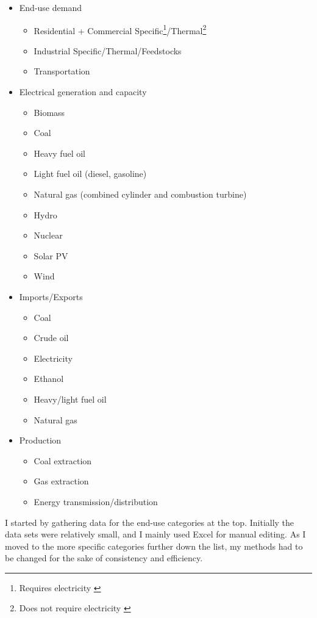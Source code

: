 \documentclass{article}
\begin{document}
\begin{itemize}
    \item End-use demand
    \begin{itemize}
        \item Residential + Commercial Specific\footnote{Requires electricity \citep{messageDocs}}/Thermal\footnote{Does not require electricity \citep{messageDocs}}
        \item Industrial Specific/Thermal/Feedstocks
        \item Transportation
    \end{itemize}
    \item Electrical generation and capacity
    \begin{itemize}
        \item Biomass
        \item Coal
        \item Heavy fuel oil
        \item Light fuel oil (diesel, gasoline)
        \item Natural gas (combined cylinder and combustion turbine)
        \item Hydro
        \item Nuclear
        \item Solar PV
        \item Wind
    \end{itemize}
    \item Imports/Exports
    \begin{itemize}
        \item Coal
        \item Crude oil
        \item Electricity
        \item Ethanol
        \item Heavy/light fuel oil
        \item Natural gas
    \end{itemize}
    \item Production
    \begin{itemize}
        \item Coal extraction
        \item Gas extraction
        \item Energy transmission/distribution
    \end{itemize}
\end{itemize}

I started by gathering data for the end-use categories at the top. Initially the data sets were relatively small, and I mainly used Excel for manual editing. As I moved to the more specific categories further down the list, my methods had to be changed for the sake of consistency and efficiency.
\end{document}

